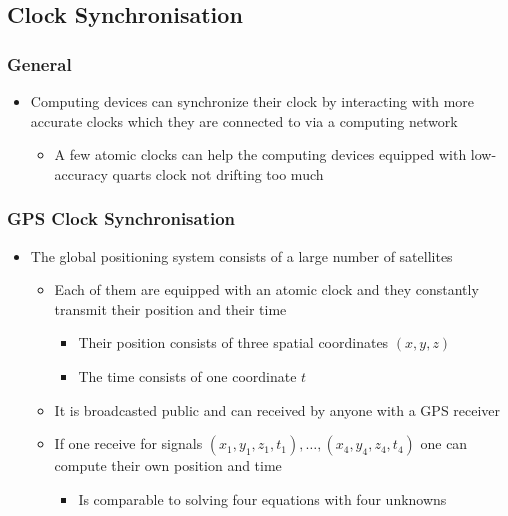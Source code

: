 \documentclass[11pt]{article}
\begin{document}
\subsection{Clock Synchronisation}
\label{sec:orgddbcac9}
\subsubsection{General}
\label{sec:org7808223}
\begin{itemize}
\item Computing devices can synchronize their clock by interacting with more accurate clocks which they are connected to via a computing network
\begin{itemize}
\item A few atomic clocks can help the computing devices equipped with low-accuracy quarts clock not drifting too much
\end{itemize}
\end{itemize}

\subsubsection{GPS Clock Synchronisation}
\label{sec:org77b9926}
\begin{itemize}
\item The global positioning system consists of a large number of satellites
\begin{itemize}
\item Each of them are equipped with an atomic clock and they constantly transmit their position and their time
\begin{itemize}
\item Their position consists of three spatial coordinates \((x,y,z)\)
\item The time consists of one coordinate \(t\)
\end{itemize}
\item It is broadcasted public and can received by anyone with a GPS receiver
\item If one receive for signals \((x_1,y_1,z_1,t_1),\dots, (x_4,y_4,z_4,t_4)\) one can compute their own position and time
\begin{itemize}
\item Is comparable to solving four equations with four unknowns
\end{itemize}
\end{itemize}
\end{itemize}
\end{document}
